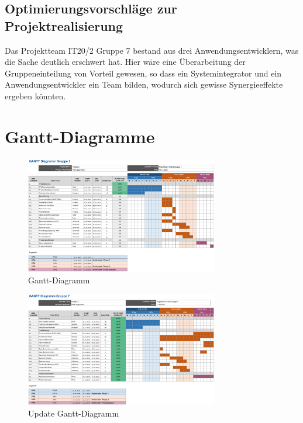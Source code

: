 \documentclass[a4paper,
    11pt,
    headings=small,
    ngerman,
    listof=totoc,
    numbers=noenddot]{scrreprt}[2021/11/13]
\begin{document}
\section{Optimierungsvorschläge zur Projektrealisierung}

Das Projektteam IT20/2 Gruppe 7 bestand aus drei Anwendungsentwicklern, was die Sache deutlich erschwert hat. Hier wäre eine Überarbeitung der Gruppeneinteilung von Vorteil gewesen, so dass ein Systemintegrator und ein Anwendungsentwickler ein Team bilden, wodurch sich gewisse Synergieeffekte ergeben könnten.


\newpage

\listoffigures
\listoftables
\lstlistoflistings
\printbibliography[keyword=Quelle,title={Literaturverzeichnis},heading=bibintoc]

\newpage

\appendix
{}



\chapter{Gantt-Diagramme}

\begin{figure}[h!]
  \centering
  \includegraphics[angle=90,origin=c,width=0.75\textwidth]{data/Gantt.png}
  \caption{Gantt-Diagramm}
  \label{fig:Gantt}
\end{figure}

\newpage

\begin{figure}[h!]
  \centering
  \includegraphics[angle=90,origin=c,width=0.75\textwidth]{data/Gantt_Abschluss.png}
  \caption{Update Gantt-Diagramm}
  \label{fig:GanttUpdate}
\end{figure}
\end{document}
